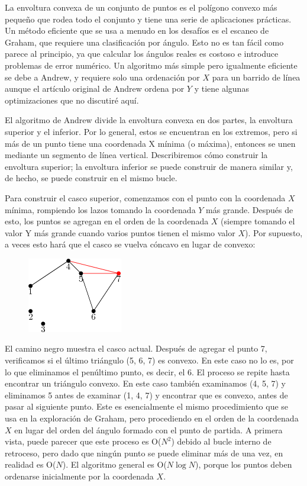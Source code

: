 La envoltura convexa de un conjunto de puntos es el polígono convexo más pequeño que rodea todo el conjunto y tiene una serie de aplicaciones prácticas. Un método eficiente que se usa a menudo en los desafíos es el escaneo de Graham, que requiere una clasificación por ángulo. Esto no es tan fácil como parece al principio, ya que calcular los ángulos reales es costoso e introduce problemas de error numérico. Un algoritmo más simple pero igualmente eficiente se debe a Andrew, y requiere solo una ordenación por $X$ para un barrido de línea aunque el artículo original de Andrew ordena por $Y$ y tiene algunas optimizaciones que no discutiré aquí.

El algoritmo de Andrew divide la envoltura convexa en dos partes, la envoltura superior y el inferior. Por lo general, estos se encuentran en los extremos, pero si más de un punto tiene una coordenada X mínima (o máxima), entonces se unen mediante un segmento de línea vertical. Describiremos cómo construir la envoltura superior; la envoltura inferior se puede construir de manera similar y, de hecho, se puede construir en el mismo bucle.

Para construir el casco superior, comenzamos con el punto con la coordenada $X$ mínima, rompiendo los lazos tomando la coordenada $Y$ más grande. Después de esto, los puntos se agregan en el orden de la coordenada $X$ (siempre tomando el valor Y más grande cuando varios puntos tienen el mismo valor $X$). Por supuesto, a veces esto hará que el casco se vuelva cóncavo en lugar de convexo:


\begin{figure}[h!]
	\centering
	\includegraphics[width=0.2\linewidth]{img/uhull}
	\label{fig:uhull}
\end{figure}


El camino negro muestra el casco actual. Después de agregar el punto 7, verificamos si el último triángulo (5, 6, 7) es convexo. En este caso no lo es, por lo que eliminamos el penúltimo punto, es decir, el 6. El proceso se repite hasta encontrar un triángulo convexo. En este caso también examinamos (4, 5, 7) y eliminamos 5 antes de examinar (1, 4, 7) y encontrar que es convexo, antes de pasar al siguiente punto. Este es esencialmente el mismo procedimiento que se usa en la exploración de Graham, pero procediendo en el orden de la coordenada $X$ en lugar del orden del ángulo formado con el punto de partida. A primera vista, puede parecer que este proceso es O($N^2$) debido al bucle interno de retroceso, pero dado que ningún punto se puede eliminar más de una vez, en realidad es O($N$). El algoritmo general es O($N \log N$), porque los puntos deben ordenarse inicialmente por la coordenada $X$.
